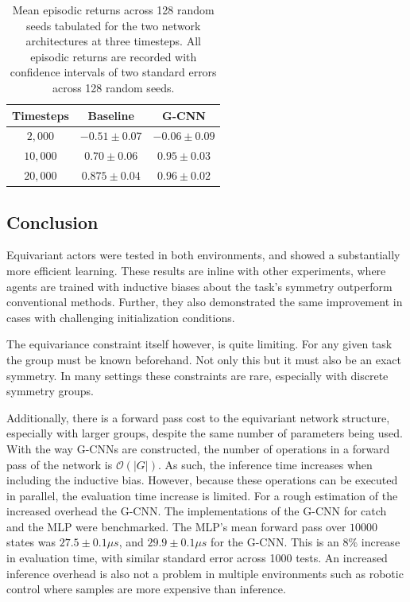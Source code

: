 \begin{table}
	\centering
	\begin{tabular}{|c|c|c|}
		\hline
		Timesteps & Baseline         & G-CNN                     \\
		\hline
		$2, 000$  & $- 0.51\pm 0.07$ & $\mathbf{-0.06 \pm 0.09}$ \\
		$10, 000$ & $0.70 \pm 0.06$  & $\mathbf{0.95 \pm 0.03} $ \\
		$20,000$  & $0.875 \pm 0.04$ & $\mathbf{0.96\pm 0.02}$   \\
		\hline
	\end{tabular}
	\caption{Mean episodic returns across 128 random seeds tabulated for the two network architectures at three timesteps. All episodic returns are recorded with confidence intervals of two standard errors across 128 random seeds.}
	\label{tab:actor-critic_catch}
\end{table}
\subsection{Conclusion}
Equivariant actors were tested in both environments, and showed a substantially more efficient learning. These results are inline with other experiments, where agents are trained with inductive biases about the task's symmetry outperform conventional methods. Further, they also demonstrated the same improvement in cases with challenging initialization conditions.

The equivariance constraint itself however, is quite limiting. For any given task the group must be known beforehand. Not only this but it must also be an exact symmetry. In many settings these constraints are rare, especially with discrete symmetry groups.

Additionally, there is a forward pass cost to the equivariant network structure, especially with larger groups, despite the same number of parameters being used. With the way G-CNNs are constructed, the number of operations in a forward pass of the network is $\mathcal{O}(|G|)$. As such, the inference time increases when including the inductive bias. However, because these operations can be executed in parallel, the evaluation time increase is limited. For a rough estimation of the increased overhead the G-CNN. The implementations of the G-CNN for catch and the MLP were benchmarked. The MLP's mean forward pass over $10000$ states was $27.5 \pm 0.1\mu s$, and $29.9 \pm 0.1 \mu s$ for the G-CNN. This is an $8\%$ increase in evaluation time, with similar standard error across 1000 tests. An increased inference overhead is also not a problem in multiple environments such as robotic control where samples are more expensive than inference.

